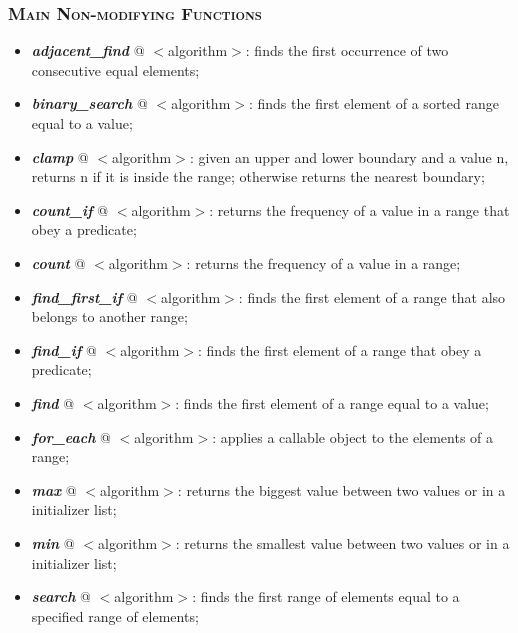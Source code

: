 \documentclass[10pt]{article}
\begin{document}
\begin{multicols*}{5}
{\subsubsection*{\textsc{Main Non-modifying Functions}} 
\begin{itemize}[leftmargin=*,topsep=0.25pt]
  \setlength\itemsep{-1.8pt}
	\item  \emph{\textbf{adjacent\_find}} @ $<$algorithm$>$: finds the first occurrence of two consecutive equal elements;
	\item  \emph{\textbf{binary\_search}} @ $<$algorithm$>$: finds the first element of a sorted range equal to a value;  
	\item  \emph{\textbf{clamp}} @ $<$algorithm$>$: given an upper and lower boundary and a value n, returns n if it is inside the range; otherwise returns the nearest boundary;  
	\item  \emph{\textbf{count\_if}} @ $<$algorithm$>$: returns the frequency of a value in a range that obey a predicate;
	\item  \emph{\textbf{count}} @ $<$algorithm$>$: returns the frequency of a value in a range; 
	\item  \emph{\textbf{find\_first\_if}} @ $<$algorithm$>$: finds the first element of a range that also belongs to another range;  
	\item  \emph{\textbf{find\_if}} @ $<$algorithm$>$: finds the first element of a range that obey a predicate;
	\item  \emph{\textbf{find}} @ $<$algorithm$>$: finds the first element of a range equal to a value; 
	\item  \emph{\textbf{for\_each}} @ $<$algorithm$>$: applies a callable object to the elements of a range;
	\item  \emph{\textbf{max}} @ $<$algorithm$>$: returns the biggest value between two values or in a initializer list;  
	\item  \emph{\textbf{min}} @ $<$algorithm$>$: returns the smallest value between two values or in a initializer list;  
	\item  \emph{\textbf{search}} @ $<$algorithm$>$: finds the first range of elements equal to a specified range of elements;  
\end{itemize}

}
\end{multicols*}
\end{document}
